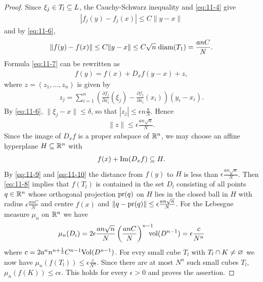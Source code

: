 \begin{proof}
  Since $\xi_j\in T_l\subseteq L$, the Cauchy-Schwarz inequality and \eqref{eq:11-4} give
  \begin{align*}
    |f_j(y) - f_j(x)| \le C\|y-x\|
  \end{align*}
  and by \eqref{eq:11-6}, 
  \begin{align}\label{eq:11-8}
    \|f(y) - f(x)\| \le C\|y-x\| \le C\sqrt{n}\;\mathrm{diam}(T_1) = \frac{anC}{N}.
  \end{align}
  Formula \eqref{eq:11-7} can be rewritten as
  \begin{align}\label{eq:11-9}
    f(y) = f(x) + D_x f(y-x) + z,
  \end{align}
  where $z = (z_1, \ldots, z_n)$ is given by 
  \begin{align*}
    z_j = \sum_{i=1}^{n }{\left(\frac{\partial f_j }{\partial x_i }(\xi_j) - \frac{\partial f_j }{\partial x_i }(x_i)\right) (y_i - x_i)}.
  \end{align*}
  By \eqref{eq:11-6}, $\|\xi_j-x\|\le \delta$, so that $|z_j|\le \epsilon n\frac aN$. Hence 
  \begin{align}\label{eq:11-10}
    \|z\| \le \epsilon \frac{an\sqrt{n}}{N}.
  \end{align}
  Since the image of $D_xf$ is a proper subspace of ${\mathbb{R}}^n$, we may choose an affine
  hyperplane $H\subseteq {\ensuremath{\mathbb{R}}}^n$ with
  \begin{align*}
    f(x) + \operatorname{Im} (D_xf)\subseteq H.
  \end{align*}
  By \eqref{eq:11-9} and \eqref{eq:11-10} the distance from $f(y)$ to $H$ is less than $\epsilon \frac{an\sqrt{n}}{N}$. 
  Then \eqref{eq:11-8} implies that $f(T_l)$ is contained in the set $D_l$ consisting of all points $q\in{\ensuremath{\mathbb{R}}}^n$ whose
  orthogonal projection $\mathrm{pr}(q)$ on $H$ lies in the closed ball in $H$ with radius $\epsilon \frac{anC}{N}$
  and centre $f(x)$ and $\|q-\mathrm{pr}(q)\|\le \epsilon \frac{an\sqrt{n}}{N}$. For the Lebesgue measure $\mu_n$ on ${\mathbb{R}}^n$
  we have
  \begin{align*}
    \mu_n(D_i) 
      = 2\epsilon \frac{an\sqrt{n}}{N} \left(\frac{anC }{N }\right)^{n-1}
        \mkern-15mu\mathrm{vol}(D^{n-1})
      = \epsilon \frac{c}{N^n}
  \end{align*}
  where $c = 2a^nn^{n+\frac12}C^{n-1}\mathrm{Vol}(D^{n-1})$. For evry small cube $T_l$ with $T_l\cap K\neq\varnothing$
  we now have $\mu_n(f(T_l))\le \epsilon\frac{c}{N^n}$. Since there are at most $N^n$ such small cubes $T_l$,
  $\mu_n(f(K))\le c\epsilon$. This holds for every $\epsilon>0$ and proves the assertion.
\end{proof}

